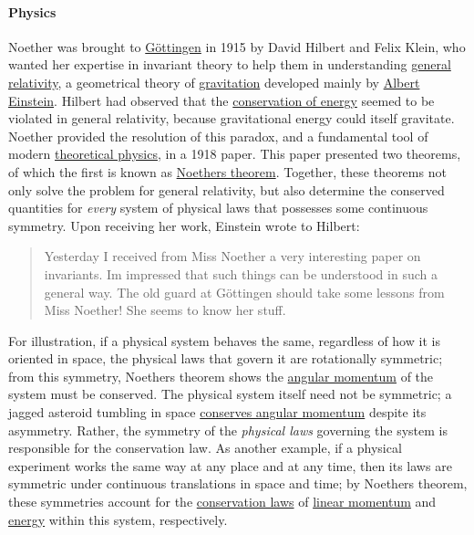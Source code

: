 \paragraph{Physics}\label{Physics}

Noether was brought to \href{https://en.wikipedia.org/wiki/Göttingen}{Göttingen} in 1915 by David Hilbert and Felix Klein, who wanted her expertise in invariant theory to help them in understanding \href{https://en.wikipedia.org/wiki/General_relativity}{general relativity}, a geometrical theory of \href{https://en.wikipedia.org/wiki/Gravitation}{gravitation} developed mainly by \href{https://en.wikipedia.org/wiki/Albert_Einstein}{Albert Einstein}. Hilbert had observed that the \href{https://en.wikipedia.org/wiki/Conservation_of_energy}{conservation of energy} seemed to be violated in general relativity, because gravitational energy could itself gravitate. Noether provided the resolution of this paradox, and a fundamental tool of modern \href{https://en.wikipedia.org/wiki/Theoretical_physics}{theoretical physics}, in a 1918 paper. This paper presented two theorems, of which the first is known as \href{https://en.wikipedia.org/wiki/Noether's_theorem}{Noether\textquotesingle s theorem}. Together, these theorems not only solve the problem for general relativity, but also determine the conserved quantities for \emph{every} system of physical laws that possesses some continuous symmetry. Upon receiving her work, Einstein wrote to Hilbert:

\begin{quote}
Yesterday I received from Miss Noether a very interesting paper on invariants. I\textquotesingle m impressed that such things can be understood in such a general way. The old guard at Göttingen should take some lessons from Miss Noether! She seems to know her stuff.
\end{quote}

For illustration, if a physical system behaves the same, regardless of how it is oriented in space, the physical laws that govern it are rotationally symmetric; from this symmetry, Noether\textquotesingle s theorem shows the \href{https://en.wikipedia.org/wiki/Angular_momentum}{angular momentum} of the system must be conserved. The physical system itself need not be symmetric; a jagged asteroid tumbling in space \href{https://en.wikipedia.org/wiki/Conservation_of_angular_momentum}{conserves angular momentum} despite its asymmetry. Rather, the symmetry of the \emph{physical laws} governing the system is responsible for the conservation law. As another example, if a physical experiment works the same way at any place and at any time, then its laws are symmetric under continuous translations in space and time; by Noether\textquotesingle s theorem, these symmetries account for the \href{https://en.wikipedia.org/wiki/Conservation_laws}{conservation laws} of \href{https://en.wikipedia.org/wiki/Linear_momentum}{linear momentum} and \href{https://en.wikipedia.org/wiki/Energy}{energy} within this system, respectively.

